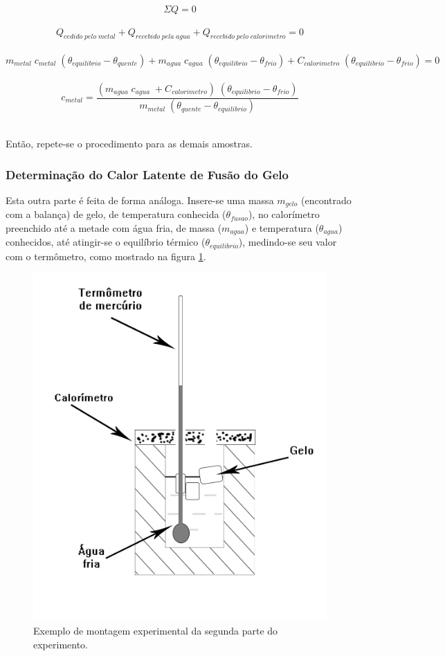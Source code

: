\documentclass[12pt,a4paper]{article}
\begin{document}
$$\Sigma Q = 0$$\
$$Q_{cedido\; pelo\; metal} + Q_{recebido\; pela\; agua} + Q_{recebido\; pelo\; calorimetro} = 0$$\
$$m_{metal} \; c_{metal} \; (\theta_{equilibrio} - \theta_{quente}) + m_{agua} \; c_{agua} \;  (\theta_{equilibrio} - \theta_{frio}) + C_{calorimetro} \; (\theta_{equilibrio} - \theta_{frio}) = 0$$\
$$c_{metal} = \frac{(m_{agua} \; c_{agua} \; + C_{calorimetro}) \; (\theta_{equilibrio} - \theta_{frio})}{m_{metal} \;(\theta_{quente} - \theta_{equilibrio})}$$\

Então, repete-se o procedimento para as demais amostras.

\subsubsection{Determinação do Calor Latente de Fusão do Gelo}

Esta outra parte é feita de forma análoga. Insere-se uma massa $m_{gelo}$ (encontrado com a balança) de gelo, de temperatura conhecida ($\theta_{fusao}$), no calorímetro preenchido até a metade com água fria, de massa ($m_{agua}$) e temperatura ($\theta_{agua}$) conhecidos, até atingir-se o equilíbrio térmico ($\theta_{equilibrio}$), medindo-se seu valor com o termômetro, como mostrado na figura \ref{CalorGelo}.

\begin{figure}[!htbp]
\centering
\includegraphics[scale=0.45]{Fig6b2.jpg}
\caption{Exemplo de montagem experimental da segunda parte do experimento.}
\label{CalorGelo}
\end{figure}
\end{document}
